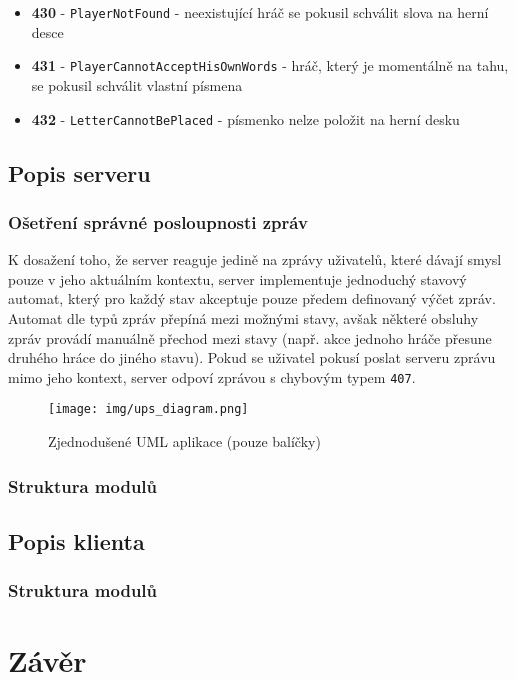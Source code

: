 \documentclass[12pt, a4paper]{article}
\let\oldsection\section
\renewcommand\section{\clearpage\oldsection}
\begin{document}
\begin{itemize}
			\item \textbf{430} - \texttt{PlayerNotFound} - neexistující hráč se pokusil schválit slova na herní desce
						
			\item \textbf{431} - \texttt{PlayerCannotAcceptHisOwnWords} - hráč, který je momentálně na tahu, se pokusil schválit vlastní písmena
												
			\item \textbf{432} - \texttt{LetterCannotBePlaced} - písmenko nelze položit na herní desku
		\end{itemize}

	    \subsection{Popis serveru}
	  		\subsubsection{Ošetření správné posloupnosti zpráv}
	  		K dosažení toho, že server reaguje jedině na zprávy uživatelů, které dávají smysl pouze v jeho aktuálním kontextu, server implementuje jednoduchý stavový automat, který pro každý stav akceptuje pouze předem definovaný výčet zpráv. Automat dle typů zpráv přepíná mezi možnými stavy, avšak některé obsluhy zpráv provádí manuálně přechod mezi stavy (např. akce jednoho hráče přesune druhého hráce do jiného stavu). Pokud se uživatel pokusí poslat serveru zprávu mimo jeho kontext, server odpoví zprávou s chybovým typem \texttt{407}.
\begin{figure}[!ht]
\centering
{\texttt{[image: img/ups\_diagram.png]}}
\caption{Zjednodušené UML aplikace (pouze balíčky)}
\label{fig:photo}
\end{figure}
		    \subsubsection{Struktura modulů}

	    \subsection{Popis klienta}
   		    \subsubsection{Struktura modulů}
    
    \section{Závěr}
    



	
	
\end{document}
